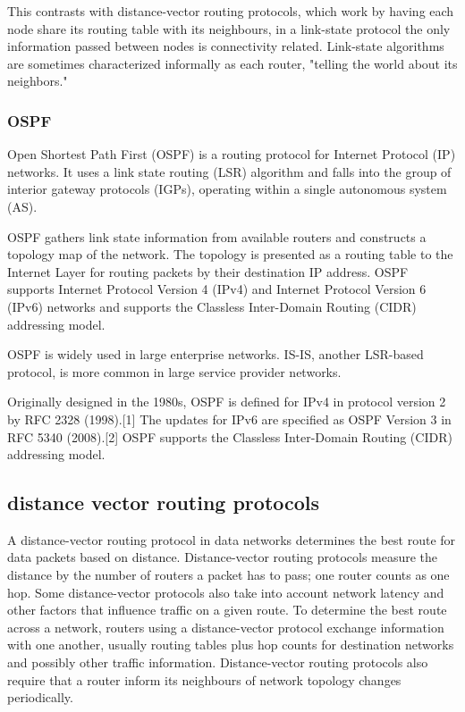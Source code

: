 \documentclass[a4paper,12pt]{article}
\begin{document}
This contrasts with distance-vector routing protocols, which work by having each node share its routing table with its neighbours, in a link-state protocol the only information passed between nodes is connectivity related. Link-state algorithms are sometimes characterized informally as each router, "telling the world about its neighbors."

\subsubsection{OSPF}
Open Shortest Path First (OSPF) is a routing protocol for Internet Protocol (IP) networks. It uses a link state routing (LSR) algorithm and falls into the group of interior gateway protocols (IGPs), operating within a single autonomous system (AS).

OSPF gathers link state information from available routers and constructs a topology map of the network. The topology is presented as a routing table to the Internet Layer for routing packets by their destination IP address. OSPF supports Internet Protocol Version 4 (IPv4) and Internet Protocol Version 6 (IPv6) networks and supports the Classless Inter-Domain Routing (CIDR) addressing model.

OSPF is widely used in large enterprise networks. IS-IS, another LSR-based protocol, is more common in large service provider networks.

Originally designed in the 1980s, OSPF is defined for IPv4 in protocol version 2 by RFC 2328 (1998).[1] The updates for IPv6 are specified as OSPF Version 3 in RFC 5340 (2008).[2] OSPF supports the Classless Inter-Domain Routing (CIDR) addressing model.

\subsection{distance vector routing protocols}
A distance-vector routing protocol in data networks determines the best route for data packets based on distance. Distance-vector routing protocols measure the distance by the number of routers a packet has to pass; one router counts as one hop. Some distance-vector protocols also take into account network latency and other factors that influence traffic on a given route. To determine the best route across a network, routers using a distance-vector protocol exchange information with one another, usually routing tables plus hop counts for destination networks and possibly other traffic information. Distance-vector routing protocols also require that a router inform its neighbours of network topology changes periodically.
\end{document}
